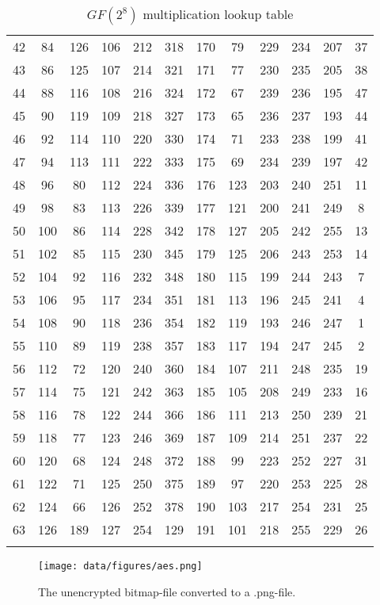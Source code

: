 \begin{longtable}{ccc|ccc|ccc|ccc}
  42 & 84  & 126 & 106 & 212 & 318 & 170 & 79  & 229 & 234 & 207 & 37  \\
  43 & 86  & 125 & 107 & 214 & 321 & 171 & 77  & 230 & 235 & 205 & 38  \\
  44 & 88  & 116 & 108 & 216 & 324 & 172 & 67  & 239 & 236 & 195 & 47  \\
  45 & 90  & 119 & 109 & 218 & 327 & 173 & 65  & 236 & 237 & 193 & 44  \\
  46 & 92  & 114 & 110 & 220 & 330 & 174 & 71  & 233 & 238 & 199 & 41  \\
  47 & 94  & 113 & 111 & 222 & 333 & 175 & 69  & 234 & 239 & 197 & 42  \\
  48 & 96  & 80  & 112 & 224 & 336 & 176 & 123 & 203 & 240 & 251 & 11  \\
  49 & 98  & 83  & 113 & 226 & 339 & 177 & 121 & 200 & 241 & 249 & 8   \\
  50 & 100 & 86  & 114 & 228 & 342 & 178 & 127 & 205 & 242 & 255 & 13  \\
  51 & 102 & 85  & 115 & 230 & 345 & 179 & 125 & 206 & 243 & 253 & 14  \\
  52 & 104 & 92  & 116 & 232 & 348 & 180 & 115 & 199 & 244 & 243 & 7   \\
  53 & 106 & 95  & 117 & 234 & 351 & 181 & 113 & 196 & 245 & 241 & 4   \\
  54 & 108 & 90  & 118 & 236 & 354 & 182 & 119 & 193 & 246 & 247 & 1   \\
  55 & 110 & 89  & 119 & 238 & 357 & 183 & 117 & 194 & 247 & 245 & 2   \\
  56 & 112 & 72  & 120 & 240 & 360 & 184 & 107 & 211 & 248 & 235 & 19  \\
  57 & 114 & 75  & 121 & 242 & 363 & 185 & 105 & 208 & 249 & 233 & 16  \\
  58 & 116 & 78  & 122 & 244 & 366 & 186 & 111 & 213 & 250 & 239 & 21  \\
  59 & 118 & 77  & 123 & 246 & 369 & 187 & 109 & 214 & 251 & 237 & 22  \\
  60 & 120 & 68  & 124 & 248 & 372 & 188 & 99  & 223 & 252 & 227 & 31  \\
  61 & 122 & 71  & 125 & 250 & 375 & 189 & 97  & 220 & 253 & 225 & 28  \\
  62 & 124 & 66  & 126 & 252 & 378 & 190 & 103 & 217 & 254 & 231 & 25  \\
  63 & 126 & 189 & 127 & 254 & 129 & 191 & 101 & 218 & 255 & 229 & 26 \\
  \caption{$GF(2^8)$ multiplication lookup table}
  \label{t:GFMLT}
\end{longtable}
\begin{figure}[h]
\centering
\texttt{[image: data/figures/aes.png]}
\caption{The unencrypted bitmap-file converted to a .png-file.}
\label{fig:aespng}
\end{figure}

